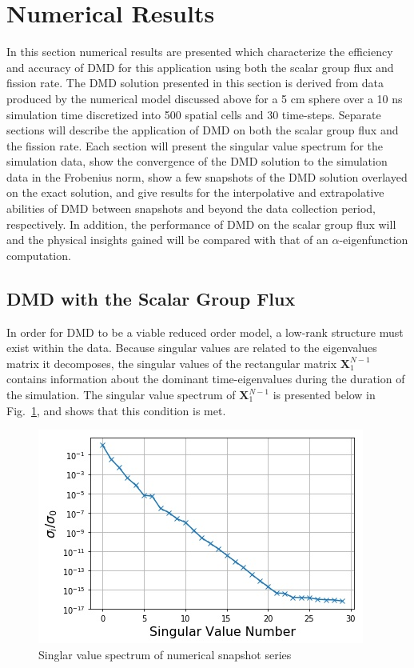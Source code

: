 \documentclass{style/nseJournal}
\newcommand{\LFI}[1]{\label{fi:#1}}
\newcommand{\FI}[1]{Fig.~\ref{fi:#1}}
\newcommand{\bfg}{\begin{figure}}
\newcommand{\efg}{\end{figure}}
\begin{document}
\section{Numerical Results}
In this section numerical results are presented which characterize the efficiency and accuracy of DMD for this application using both the scalar group flux and fission rate.  
The DMD solution presented in this section is derived from data produced by the numerical model discussed above for a 5 cm sphere over a 10 ns simulation time discretized into 500 spatial cells and 30 time-steps.  
Separate sections will describe the application of DMD on both the scalar group flux and the fission rate.  
Each section will present the singular value spectrum for the simulation data, show the convergence of the DMD solution to the simulation data in the Frobenius norm, show a few snapshots of the DMD solution overlayed on the exact solution, and give results for the interpolative and extrapolative abilities of DMD between snapshots and beyond the data collection period, respectively.  
In addition, the performance of DMD on the scalar group flux will and the physical insights gained will be compared with that of an $\alpha$-eigenfunction computation.  

\subsection{DMD with the Scalar Group Flux}
In order for DMD to be a viable reduced order model, a low-rank structure must exist within the data.  
Because singular values are related to the eigenvalues matrix it decomposes, the singular values of the rectangular matrix $\bm{X}^{N-1}_1$ contains information about the dominant time-eigenvalues during the duration of the simulation.  
The singular value spectrum of  $\bm{X}^{N-1}_1$ is presented below in \FI{sv-spec}, and shows that this condition is met.  

\bfg[h] \centering
	\includegraphics[scale=0.5]{figures/flux_singularValueSpectrum.jpg}
	\caption{Singlar value spectrum of numerical snapshot series}
	\LFI{sv-spec}
\efg
\end{document}
